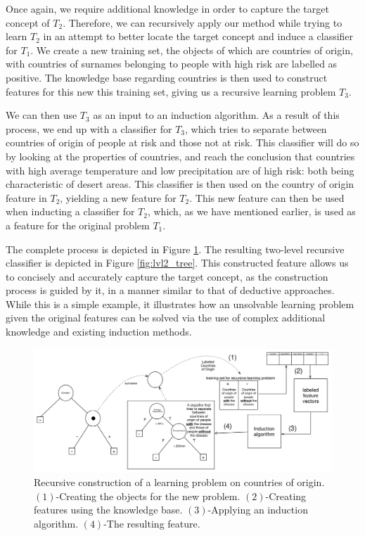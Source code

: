 \documentclass[twoside,11pt]{article}
\theoremstyle{definition}
\begin{document}
Once again, we require additional knowledge in order to capture the target concept of $T_2$. 
Therefore, we can recursively apply our method while trying to learn $T_2$ in an attempt to better locate the target concept and induce a classifier for $T_1$.
We create a new training set, the objects of which are countries of origin, with countries of surnames belonging to people with high risk are labelled as positive. The knowledge base regarding countries is then used to construct features for this new this training set, giving us a recursive learning problem $T_3$.

We can then use $T_3$ as an input to an induction algorithm. As a result of this process, we end up with a classifier for $T_3$, which tries to separate between countries of origin of people at risk and those not at risk. This classifier will do so by looking at the properties of countries, and reach the conclusion that countries with high average temperature and low precipitation are of high risk: both being characteristic of desert areas.
This classifier is then used on the country of origin feature in $T_2$, yielding a new feature for $T_2$.  This new feature can then be used when inducting a classifier for $T_2$, which, as we have mentioned earlier, is used as a feature for the original problem $T_1$.

The complete process is depicted in Figure \ref{fig:moving_to_lvl2}. The resulting two-level recursive classifier is depicted in Figure \ref{fig:lvl2_tree}. This constructed feature allows us to concisely and accurately capture the target concept, as the construction process is guided by it, in a manner similar to that of deductive approaches.
While this is a simple example, it illustrates how an unsolvable learning problem given the original features can be solved via the use of complex additional knowledge and existing induction methods.


\begin{figure}[t]
	\centering
	\includegraphics[width=\linewidth]{fig4_annotated.pdf}
	\caption{Recursive construction of a learning problem on countries of origin. $(1)$-Creating the objects for the new problem. $(2)$-Creating features using the knowledge base. $(3)$-Applying an induction algorithm. $(4)$-The resulting feature.}
	\label{fig:moving_to_lvl2}
\end{figure}
\end{document}
